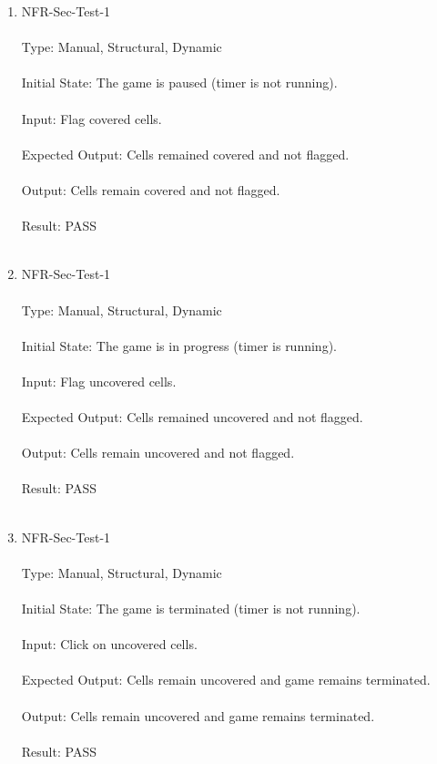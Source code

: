 \documentclass[12pt, titlepage]{article}
\begin{document}
\begin{enumerate}
\item{NFR-Sec-Test-1\\\\}
Type: Manual, Structural, Dynamic\\\\				
Initial State: The game is paused (timer is not running).\\\\
Input: Flag covered cells.\\\\					
Expected Output: Cells remained covered and not flagged. \\\\
Output: Cells remain covered and not flagged. \\\\
Result: PASS\\\\

\newpage
\item{NFR-Sec-Test-1\\\\}
Type: Manual, Structural, Dynamic\\\\				
Initial State: The game is in progress (timer is running).\\\\
Input: Flag uncovered cells.\\\\					
Expected Output: Cells remained uncovered and not flagged. \\\\
Output: Cells remain uncovered and not flagged. \\\\
Result: PASS\\\\

\item{NFR-Sec-Test-1\\\\}
Type: Manual, Structural, Dynamic\\\\				
Initial State: The game is terminated (timer is not running).\\\\
Input: Click on uncovered cells.\\\\					
Expected Output: Cells remain uncovered and game remains terminated. \\\\
Output: Cells remain uncovered and game remains terminated. \\\\
Result: PASS\\\\


\end{enumerate}
\end{document}
